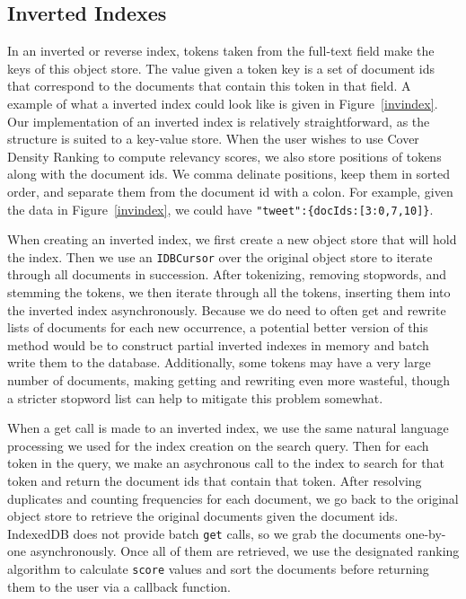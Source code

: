\documentclass{vldb}
\begin{document}
\subsection{Inverted Indexes}

In an inverted or reverse index, tokens taken from the full-text field make the keys of this object store. The value given a token key is a set of document ids that correspond to the documents that contain this token in that field. A example of what a inverted index could look like is given in Figure~\ref{invindex}. Our implementation of an inverted index is relatively straightforward, as the structure is suited to a key-value store. When the user wishes to use Cover Density Ranking to compute relevancy scores, we also store positions of tokens along with the document ids. We comma delinate positions, keep them in sorted order, and separate them from the document id with a colon. For example, given the data in Figure~\ref{invindex}, we could have \texttt{"tweet":\{docIds:[3:0,7,10]\}}.

When creating an inverted index, we first create a new object store that will hold the index. Then we use an \texttt{IDBCursor} over the original object store to iterate through all documents in succession. After tokenizing, removing stopwords, and stemming the tokens, we then iterate through all the tokens, inserting them into the inverted index asynchronously. Because we do need to often get and rewrite lists of documents for each new occurrence, a potential better version of this method would be to construct partial inverted indexes in memory and batch write them to the database. Additionally, some tokens may have a very large number of documents, making getting and rewriting even more wasteful, though a stricter stopword list can help to mitigate this problem somewhat.

When a get call is made to an inverted index, we use the same natural language processing we used for the index creation on the search query. Then for each token in the query, we make an asychronous call to the index to search for that token and return the document ids that contain that token. After resolving duplicates and counting frequencies for each document, we go back to the original object store to retrieve the original documents given the document ids. IndexedDB does not provide batch \texttt{get} calls, so we grab the documents one-by-one asynchronously. Once all of them are retrieved, we use the designated ranking algorithm to calculate \texttt{score} values and sort the documents before returning them to the user via a callback function.
\end{document}
